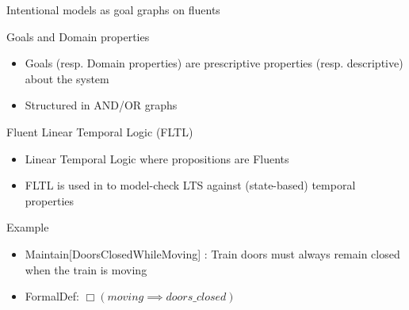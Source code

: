 \begin{frame}{Intentional models as goal graphs on fluents}
	\begin{block}{Goals and Domain properties}
		\begin{itemize}
			\item Goals (resp. Domain properties) are prescriptive properties (resp. descriptive) about the system \cite{AVL09}
			\item Structured in AND/OR graphs
		\end{itemize}
	\end{block}
	\begin{block}{Fluent Linear Temporal Logic (FLTL)}
		\begin{itemize}
			\item Linear Temporal Logic \cite{Manna92} where propositions are Fluents
			\item FLTL is used in \cite{Gianna03} to model-check LTS against (state-based) temporal properties
		\end{itemize}
	\end{block}
	\begin{block}{Example}
		\begin{itemize}
			\item Maintain[DoorsClosedWhileMoving] : Train doors must always remain closed when the train is moving
			\item FormalDef: $\Box(moving \implies doors\_closed) $
		\end{itemize}
	\end{block}
\end{frame}

